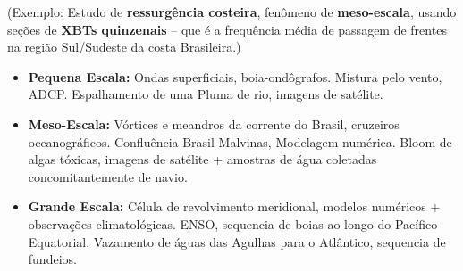 \documentclass[letterpaper,portuguese,12pt,pdftex]{exam}
\begin{document}
\begin{questions}
\begin{parts}
  (Exemplo: Estudo de {\bf ressurgência costeira}, fenômeno de {\bf meso-escala},
  usando seções de {\bf XBTs quinzenais} -- que é a frequência média de passagem
  de frentes na região Sul/Sudeste da costa Brasileira.)

  \begin{solution}
    \begin{itemize}
      \item {\bf Pequena Escala:} Ondas superficiais, boia-ondôgrafos.
            Mistura pelo vento, ADCP. Espalhamento de uma Pluma de rio, imagens
            de satélite.
      \item {\bf Meso-Escala:} Vórtices e meandros da corrente do Brasil,
            cruzeiros oceanográficos.  Confluência Brasil-Malvinas, Modelagem
            numérica.  Bloom de algas tóxicas, imagens de satélite + amostras de
            água coletadas concomitantemente de navio.
      \item {\bf Grande Escala:}  Célula de revolvimento meridional, modelos
            numéricos + observações climatológicas.  ENSO, sequencia de boias ao
            longo do Pacífico Equatorial.  Vazamento de águas das Agulhas para o
            Atlântico, sequencia de fundeios.
    \end{itemize}
  \end{solution}
  \end{parts}

  \question
\end{questions}
\end{document}
